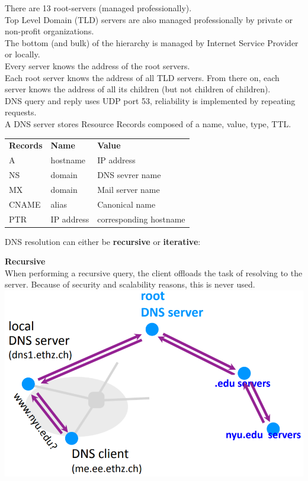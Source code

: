 \documentclass[a4paper, fontsize=8pt, landscape, DIV=1]{scrartcl}
\begin{document}
\begin{multicols*}{4}
		There are 13 root-servers (managed professionally).\\
		Top Level Domain (TLD) servers are also managed professionally by private or
		non-profit organizations.\\
		The bottom (and bulk) of the hierarchy is managed by Internet Service Provider
		or locally. \\
		Every server knows the address of the root servers.\\
		Each root server knows the address of all TLD servers. From there on, each
		server knows the address of all its children (but not children of children).\\
		DNS query and reply uses UDP port 53, reliability is implemented by repeating
		requests.\\
		A DNS server stores Resource Records composed of a name, value, type, TTL.
		\vspace{0.2cm}
		
		\begin{tabular}{l l l}
			\textbf{Records} & \textbf{Name}  & \textbf{Value} \\ 
			A	  & hostname   & IP address  \\ 
			NS	  & domain 	   & DNS sevrer name \\ 
			MX	  & domain 	   & Mail server name \\ 
			CNAME & alias 	   & Canonical name \\  
			PTR	  & IP address & corresponding hostname \\ 
		\end{tabular} 
		
		DNS resolution can either be \textbf{recursive} or \textbf{iterative}:\par
		
		\textbf{Recursive}\\
		When performing a recursive query, the client offloads  the task of resolving
		to the server. 
		Because of security and scalability reasons, this is never used.\\
		
		\includegraphics[width=\columnwidth]{images/Application_Layer/dns_recursive.png}
		\par 
		

\end{multicols*}
\end{document}
